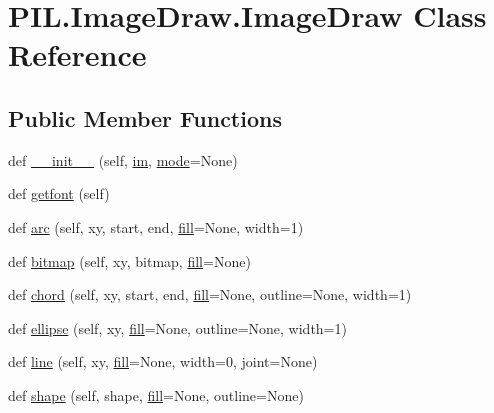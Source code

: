 \hypertarget{classPIL_1_1ImageDraw_1_1ImageDraw}{}\section{P\+I\+L.\+Image\+Draw.\+Image\+Draw Class Reference}
\label{classPIL_1_1ImageDraw_1_1ImageDraw}
\subsection*{Public Member Functions}
\begin{DoxyCompactItemize}
\item 
def \hyperlink{classPIL_1_1ImageDraw_1_1ImageDraw_adc7e9dc9215805aa2da5792dbdbf8e55}{\+\_\+\+\_\+init\+\_\+\+\_\+} (self, \hyperlink{classPIL_1_1ImageDraw_1_1ImageDraw_afa28e22f8d9b954ba6bd1e2ca6cb0498}{im}, \hyperlink{classPIL_1_1ImageDraw_1_1ImageDraw_a72a51b94d66cbfd7d8f03f7385d31b10}{mode}=None)
\item 
def \hyperlink{classPIL_1_1ImageDraw_1_1ImageDraw_ada6646611d0c636b074a55325e009ace}{getfont} (self)
\item 
def \hyperlink{classPIL_1_1ImageDraw_1_1ImageDraw_af6f59e7bea76696bb9caf55a830587da}{arc} (self, xy, start, end, \hyperlink{classPIL_1_1ImageDraw_1_1ImageDraw_aae14451f06798e855e851364079caa8a}{fill}=None, width=1)
\item 
def \hyperlink{classPIL_1_1ImageDraw_1_1ImageDraw_ab6e55ef20bfd89284ce048f88aa109fa}{bitmap} (self, xy, bitmap, \hyperlink{classPIL_1_1ImageDraw_1_1ImageDraw_aae14451f06798e855e851364079caa8a}{fill}=None)
\item 
def \hyperlink{classPIL_1_1ImageDraw_1_1ImageDraw_ab2a88c2f223d77130d450dda11773c27}{chord} (self, xy, start, end, \hyperlink{classPIL_1_1ImageDraw_1_1ImageDraw_aae14451f06798e855e851364079caa8a}{fill}=None, outline=None, width=1)
\item 
def \hyperlink{classPIL_1_1ImageDraw_1_1ImageDraw_aa3bb2ba492f17b92f7aedee6b4357ead}{ellipse} (self, xy, \hyperlink{classPIL_1_1ImageDraw_1_1ImageDraw_aae14451f06798e855e851364079caa8a}{fill}=None, outline=None, width=1)
\item 
def \hyperlink{classPIL_1_1ImageDraw_1_1ImageDraw_a219a70b68d37ef9099633d3f0fbfe5a2}{line} (self, xy, \hyperlink{classPIL_1_1ImageDraw_1_1ImageDraw_aae14451f06798e855e851364079caa8a}{fill}=None, width=0, joint=None)
\item 
def \hyperlink{classPIL_1_1ImageDraw_1_1ImageDraw_a342045083ba5ab5f39168b2b6fe61819}{shape} (self, shape, \hyperlink{classPIL_1_1ImageDraw_1_1ImageDraw_aae14451f06798e855e851364079caa8a}{fill}=None, outline=None)

\end{DoxyCompactItemize}
